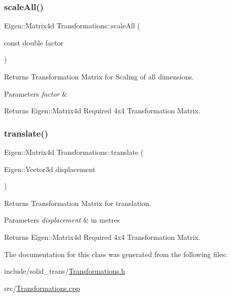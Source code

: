 \subsubsection{\texorpdfstring{scale\+All()}{scaleAll()}}
{\footnotesize\ttfamily Eigen\+::\+Matrix4d Transformations\+::scale\+All (\begin{DoxyParamCaption}\item[{const double}]{factor }\end{DoxyParamCaption})}



Returns Transformation Matrix for Scaling of all dimensions. 


\begin{DoxyParams}{Parameters}
{\em factor} & \\
\hline
\end{DoxyParams}
\begin{DoxyReturn}{Returns}
Eigen\+::\+Matrix4d Required 4x4 Transformation Matrix. 
\end{DoxyReturn}
\mbox{\label{classTransformations_a7b7212f21b4e71ea50526e8359d74929}} 
\subsubsection{\texorpdfstring{translate()}{translate()}}
{\footnotesize\ttfamily Eigen\+::\+Matrix4d Transformations\+::translate (\begin{DoxyParamCaption}\item[{Eigen\+::\+Vector3d}]{displacement }\end{DoxyParamCaption})}



Returns Transformation Matrix for translation. 


\begin{DoxyParams}{Parameters}
{\em displacement} & in metres \\
\hline
\end{DoxyParams}
\begin{DoxyReturn}{Returns}
Eigen\+::\+Matrix4d Required 4x4 Transformation Matrix. 
\end{DoxyReturn}


The documentation for this class was generated from the following files\+:\begin{DoxyCompactItemize}
\item 
include/solid\+\_\+trans/\hyperlink{Transformations_8h}{Transformations.\+h}\item 
src/\hyperlink{Transformations_8cpp}{Transformations.\+cpp}\end{DoxyCompactItemize}
